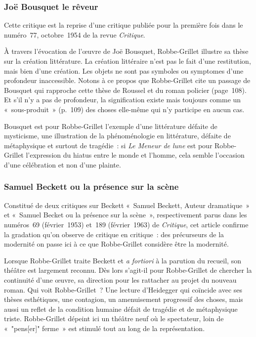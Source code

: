 \documentclass[12pt, a4paper]{article}
\begin{document}
\subsubsection{Joë Bousquet le rêveur}
Cette critique est la reprise d'une critique publiée pour la première fois dans le numéro~77, octobre~1954 de la revue \textit{Critique}.

À travers l'évocation de l'œuvre de Joë Bousquet, Robbe-Grillet illustre sa thèse sur la création littérature. La création littéraire n'est pas le fait d'une restitution, mais bien d'une création. Les objets ne sont pas symboles ou symptomes d'une profondeur inaccessible. Notons à ce propos que Robbe-Grillet cite un passage de Bousquet qui rapproche cette thèse de Roussel et du roman policier (page~108). Et s'il n'y a pas de profondeur, la signification existe mais toujours comme un «~sous-produit~» (p.~109) des choses elle-même qui n'y participe en aucun cas.

Bousquet est pour Robbe-Grillet l'exemple d'une littérature défaite de mysticisme, une illustration de la phénoménologie en littérature, défaite de métaphysique et surtout de tragédie~: si \textit{Le Meneur de lune} est pour Robbe-Grillet l'expression du hiatus entre le monde et l'homme, cela semble l'occasion d'une célébration et non d'une plainte.


\subsubsection{Samuel Beckett ou la présence sur la scène}
Constitué de deux critiques sur Beckett «~Samuel Beckett, Auteur dramatique~» et «~Samuel Becket ou la présence sur la scène~», respectivement parus dans les numéros~69 (février~1953) et~189 (février~1963) de \textit{Critique}, cet article confirme la gradation qu'on observe de critique en critique~: des précurseurs de la modernité on passe ici à ce que Robbe-Grillet considère être la modernité.

Lorsque Robbe-Grillet traite Beckett et \textit{a fortiori} à la parution du recueil, son théâtre est largement reconnu. Dès lors s'agit-il pour Robbe-Grillet de chercher la continuité d'une œuvre, sa direction pour les rattacher au projet du nouveau roman. Qui voit Robbe-Grillet~? Une lecture d'Heidegger qui coïncide avec ses thèses esthétiques, une contagion, un amenuisement progressif des choses, mais aussi un reflet de la condition humaine défait de tragédie et de métaphysique triste. Robbe-Grillet dépeint ici un théâtre neuf où le spectateur, loin de «~"pens[er]" ferme~» est stimulé tout au long de la représentation.
\end{document}
